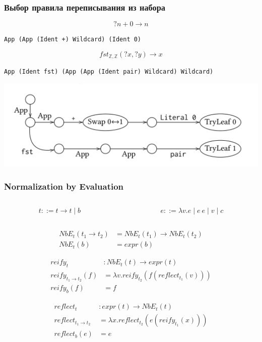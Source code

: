 \documentclass[xcolor=table]{beamer}
\begin{document}
\begin{frame}[fragile]
  \transwipe[direction=90]
  \frametitle{Выбор правила переписывания из набора}

\[?n + 0 \rightarrow n\]


\begin{center}
  \verb!App (App (Ident +) Wildcard) (Ident 0)!
\end{center}

\smallskip

\[fst_{\mathbb{Z}, \mathbb{Z}}(?x, ?y) \rightarrow x\]


\begin{center}
  \verb!App (Ident fst) (App (App (Ident pair) Wildcard) Wildcard)!
\end{center}

\bigskip

\begin{center}
  \includegraphics[width=\textwidth]{pictures/decisionTree.png}
\end{center}

\end{frame}

\begin{frame}[fragile]
  \transwipe[direction=90]
  \frametitle{Normalization by Evaluation}
\begin{columns}
  \begin{column}{0.4\textwidth}
    \[t ::= t \rightarrow t \mid b \]
  \end{column}
  \begin{column}{0.6\textwidth}
    \[e ::= \lambda v . e \mid e \ e \mid v \mid c \]
  \end{column}
\end{columns}

\begin{align*}
  NbE_t(t_1 \rightarrow t_2) &= NbE_t(t_1) \rightarrow NbE_t(t_2) \\
  NbE_t(b) &= expr(b)
\end{align*}

\begin{align*}
  reify_t &: NbE_t(t) \rightarrow expr(t) \\
  reify_{t_1 \rightarrow t_2}(f) &= \lambda v. reify_{t_2}(f(reflect_{t_1}(v))) \\
  reify_{b}(f) &= f
\end{align*}

\begin{align*}
  reflect_t &: expr(t) \rightarrow NbE_t(t) \\
  reflect_{t_1 \rightarrow t_2} &= \lambda x. reflect_{t_2}(e(reify_{t_1}(x))) \\
  reflect_b(e) &= e
\end{align*}
\end{frame}
\end{document}
